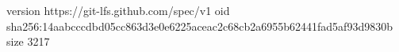 version https://git-lfs.github.com/spec/v1
oid sha256:14aabcccdbd05cc863d3e0e6225aceac2c68cb2a6955b62441fad5af93d9830b
size 3217
